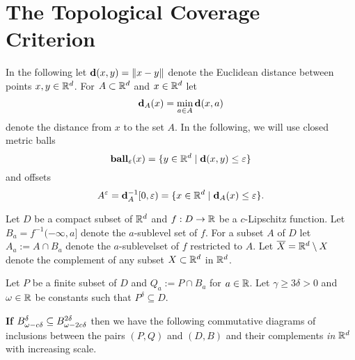 
\section{The Topological Coverage Criterion}

In the following let $\mathbf{d}(x, y) = \|x - y\|$ denote the Euclidean distance between points $x,y\in \mathbb{R}^d$.
For $A\subset\mathbb{R}^d$ and $x\in \mathbb{R}^d$ let
\[\mathbf{d}_A(x) = \min_{a\in A}\mathbf{d}(x, a)\]
denote the distance from $x$ to the set $A$.
In the following, we will use closed metric balls
\[\mathbf{ball}_\varepsilon(x) = \{y\in\mathbb{R}^d\mid \mathbf{d}(x, y)\leq \varepsilon\}\]
and offsets
\[A^\varepsilon = \mathbf{d}_A^{-1}[0, \varepsilon) = \{x\in \mathbb{R}^d\mid \mathbf{d}_A(x)\leq \varepsilon\}.\]

Let $D$ be a compact subset of $\mathbb{R}^d$ and $f : D\to \mathbb{R}$ be a $c$-Lipschitz function.
Let $B_a = f^{-1}(-\infty, a]$ denote the $a$-sublevel set of $f$.
For a subset $A$ of $D$ let $A_a := A\cap B_a$ denote the $a$-sublevelset of $f$ restricted to $A$.
Let $\overline{X} = \mathbb{R}^d\setminus X$ denote the complement of any subset $X\subset\mathbb{R}^d$ in $\mathbb{R}^d$.


Let $P$ be a finite subset of $D$ and $Q_a := P\cap B_a$ for $a\in\mathbb{R}$.
Let $\gamma\geq 3\delta > 0$ and $\omega\in\mathbb{R}$ be constants such that $P^\delta \subseteq D$.


\textbf{If $B_{\omega - c\delta}^\delta \subseteq B_{\omega - 2c{\delta}}^{{2\delta}}$} then we have the following commutative diagrams of inclusions between the pairs $(P,Q)$ and $(D, B)$ and their complements \emph{in $\mathbb{R}^d$} with increasing scale.

